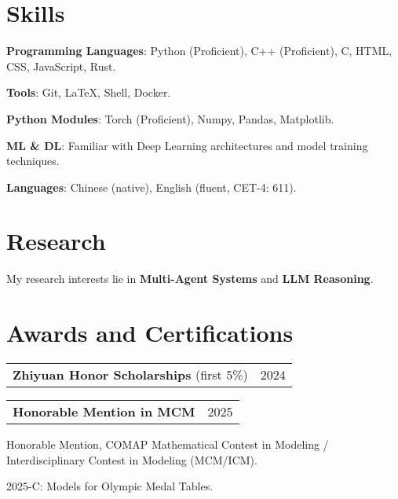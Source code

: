 \documentclass[letterpaper,11pt]{article}
\makeatletter
\newcommand{\cvitem}[1]{
  \item\small{
    {#1\vspace{-2pt}}
  }
}
\newcommand{\twopartheader}[2]{
  \vspace{-2pt}\noindent
  \begin{tabular*}{\textwidth}{l@{\extracolsep{\fill}}r}
    #1 & #2 \\
  \end{tabular*}\vspace{-7pt}
}
\newcommand{\cvheadingstart}{\begin{itemize}[leftmargin=0in, label={}]}
\newcommand{\cvheadingend}{\end{itemize}}
\newcommand{\cvitemstart}{\begin{itemize}[label=\textopenbullet]\justifying}
\newcommand{\cvitemend}{\end{itemize}\vspace{-5pt}}
\makeatother
\begin{document}
\section{Skills}
\textbf{Programming Languages}: Python (Proficient), C++ (Proficient), C, HTML, CSS, JavaScript, Rust.

\textbf{Tools}: Git, LaTeX, Shell, Docker.

\textbf{Python Modules}: Torch (Proficient), Numpy, Pandas, Matplotlib.

\textbf{ML \& DL}: Familiar with Deep Learning architectures and model training techniques.

\textbf{Languages}: Chinese (native), English (fluent, CET-4: 611).


\section{Research}

My research interests lie in \textbf{Multi-Agent Systems} and \textbf{LLM Reasoning}. 

\section{Awards and Certifications}



\twopartheader{\textbf{Zhiyuan Honor Scholarships} (first 5\%)}{2024}
\newline

\twopartheader{\textbf{Honorable Mention in MCM}}{2025}


Honorable Mention, COMAP Mathematical Contest in Modeling / Interdisciplinary Contest in Modeling (MCM/ICM).


2025-C: Models for Olympic Medal Tables.

\end{document}
